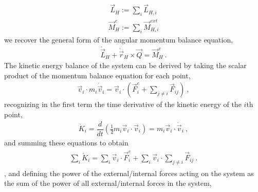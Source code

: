\documentclass[letterpaper,10pt,english]{jupyterBook}
\begin{document}
\begin{equation*}
\begin{split}\vec{L}_H := \sum_i \vec{L}_{H,i}\end{split}
\end{equation*}\begin{equation*}
\begin{split}\vec{M}_H^e := \sum_i \vec{M}_{H,i}^{ext}\end{split}
\end{equation*}
\sphinxAtStartPar
we recover the general form of the angular momentum balance equation,
\begin{equation*}
\begin{split}\dot{\vec{L}}_{H} + \dot{\vec{r}}_H \times \vec{Q} = \vec{M}_H^e \ .\end{split}
\end{equation*}
\sphinxAtStartPar
{}
The kinetic energy balance of the system can be derived by taking the scalar product of the momentum balance equation for each point,
\begin{equation*}
\begin{split}\vec{v}_i \cdot m_i \dot{\vec{v}}_i = \vec{v}_i \cdot \left( \vec{F}_i^{e} + \sum_{j \ne i} \vec{F}_{ij} \right) \ ,\end{split}
\end{equation*}
\sphinxAtStartPar
recognizing in the first term the time derivative of the kinetic energy of the \(i\)\sphinxhyphen{}th point,
\begin{equation*}
\begin{split}\dot{K}_i = \dfrac{d}{dt} \left( \frac{1}{2} m_i \vec{v}_i \cdot \vec{v}_i \right) = m_i \vec{v}_i \cdot \dot{\vec{v}}_i \ ,\end{split}
\end{equation*}
\sphinxAtStartPar
and summing these equations to obtain
\begin{equation*}
\begin{split}\begin{aligned}
  \sum_i \dot{K}_i = \sum_i \vec{v}_i \cdot  \vec{F}_i^{e} + \sum_i \vec{v}_i \cdot \sum_{j \ne i} \vec{F}_{ij} \ . 
\end{aligned}\end{split}
\end{equation*}
\sphinxAtStartPar
{}, and defining the power of the external/internal forces acting on the system as the sum of the power of all external/internal forces in the system,
\end{document}
